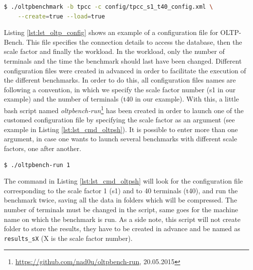 {
\singlespacing
\begin{lstlisting}[frame=single,language=bash,caption={Database population command},label={lst:lst_cmd_oltpbenchmark}]
  $ ./oltpbenchmark -b tpcc -c config/tpcc_s1_t40_config.xml \
    --create=true --load=true
\end{lstlisting}
}

Listing \ref{lst:lst_oltp_config} shows an example of a configuration file for OLTP-Bench. 
This file specifies the connection details to access the database, then the scale factor and finally the workload. 
In the workload, only the number of terminals and the time the benchmark should last have been changed. 
Different configuration files were created in advanced in order to facilitate the execution of the different benchmarks. 
In order to do this, all configuration files names are following a convention, in which we specify the scale factor number (s1 in our example) and the number of terminals (t40 in our example).
With this, a little bash script named \textit{oltpbench-run}\footnote{\url{https://github.com/nad0u/oltpbench-run}, 20.05.2015} 
has been created in order to launch one of the customed configuration file by specifying the scale factor as an argument (see example in Listing \ref{lst:lst_cmd_oltpsh}).
It is possible to enter more than one argument, in case one wants to launch several benchmarks with different scale factors, one after another.

{
\singlespacing
\begin{lstlisting}[frame=single,language=bash,caption={Bash script for launching benchmarks},label={lst:lst_cmd_oltpsh}]
  $ ./oltpbench-run 1
\end{lstlisting}
}

The command in Listing \ref{lst:lst_cmd_oltpsh} will look for the configuration file corresponding to the scale factor 1 (s1) and to 40 terminals (t40), and run the benchmark twice, saving all the data in folders which will be compressed.
The number of terminals must be changed in the script, same goes for the machine name on which the benchmark is run.
As a side note, this script will not create folder to store the results, they have to be created in advance and be named as \texttt{results\_sX} (X is the scale factor number).

{
\singlespacing
{}
    
}







